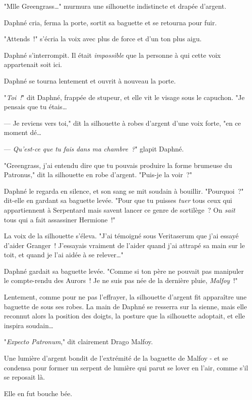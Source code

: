 "Mlle Greengrass…" murmura une silhouette indistincte et drapée d'argent.

Daphné cria, ferma la porte, sortit sa baguette et se retourna pour fuir.

"Attends~!" s'écria la voix avec plus de force et d'un ton plus aigu.

Daphné s'interrompit. Il était \emph{impossible} que la personne à qui cette voix appartenait soit ici.

Daphné se tourna lentement et ouvrit à nouveau la porte.

"\emph{Toi~!}" dit Daphné, frappée de stupeur, et elle vit le visage sous le capuchon. "Je pensais que tu étais…

--- Je reviens vers toi," dit la silhouette à robes d'argent d'une voix forte, "en ce moment dé…

--- \emph{Qu'est-ce que tu fais dans ma chambre~?}" glapit Daphné.

"Greengrass, j'ai entendu dire que tu pouvais produire la forme brumeuse du Patronus," dit la silhouette en robe d'argent. "Puis-je la voir~?"

Daphné le regarda en silence, et son sang se mit soudain à bouillir. "Pourquoi~?" dit-elle en gardant sa baguette levée. "Pour que tu puisses \emph{tuer} tous ceux qui appartiennent à Serpentard mais savent lancer ce genre de sortilège~? On \emph{sait} tous qui a fait assassiner Hermione~!"

La voix de la silhouette s'éleva. "J'ai témoigné sous Veritaserum que j'ai essayé d'aider Granger~! J'essayais vraiment de l'aider quand j'ai attrapé sa main sur le toit, et quand je l'ai aidée à se relever…"

Daphné gardait sa baguette levée. "Comme si ton père ne pouvait pas manipuler le compte-rendu des Aurors~! Je ne suis pas née de la dernière pluie, \emph{Malfoy}~!"

Lentement, comme pour ne pas l'effrayer, la silhouette d'argent fit apparaître une baguette de sous ses robes. La main de Daphné se resserra sur la sienne, mais elle reconnut alors la position des doigts, la posture que la silhouette adoptait, et elle inspira soudain…

"\emph{Expecto Patronum}," dit clairement Drago Malfoy.

Une lumière d'argent bondit de l'extrémité de la baguette de Malfoy - et se condensa pour former un serpent de lumière qui parut se lover en l'air, comme s'il se reposait là.

Elle en fut bouche bée.

